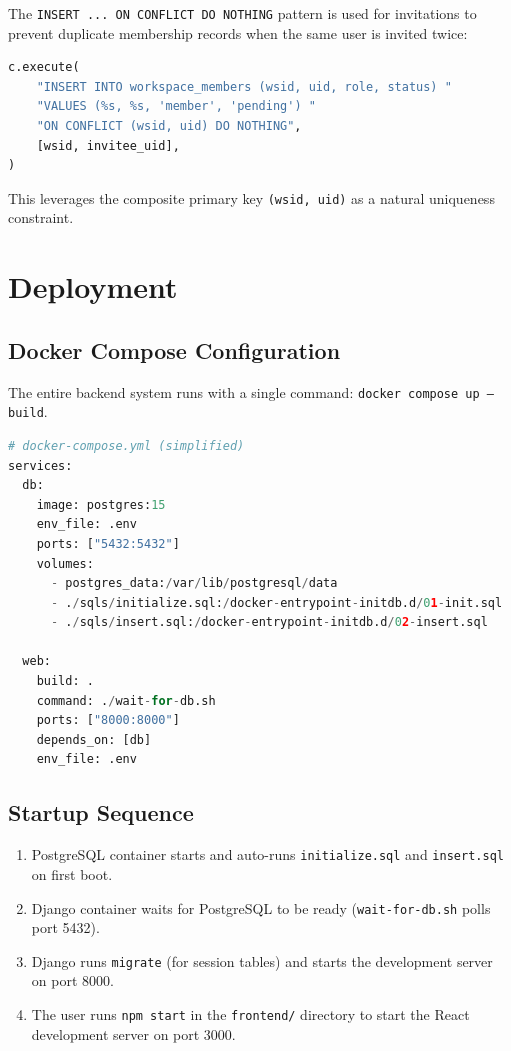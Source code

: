 \documentclass[11pt]{article}
\begin{document}
The \texttt{INSERT ... ON CONFLICT DO NOTHING} pattern is used for invitations to prevent duplicate membership records when the same user is invited twice:

\begin{lstlisting}[language=Python]
c.execute(
    "INSERT INTO workspace_members (wsid, uid, role, status) "
    "VALUES (%s, %s, 'member', 'pending') "
    "ON CONFLICT (wsid, uid) DO NOTHING",
    [wsid, invitee_uid],
)
\end{lstlisting}

This leverages the composite primary key \texttt{(wsid, uid)} as a natural uniqueness constraint.


\newpage
\section{Deployment}
\label{sec:deploy}

\subsection{Docker Compose Configuration}

The entire backend system runs with a single command: \texttt{docker compose up --build}.

\begin{lstlisting}[language=Python]
# docker-compose.yml (simplified)
services:
  db:
    image: postgres:15
    env_file: .env
    ports: ["5432:5432"]
    volumes:
      - postgres_data:/var/lib/postgresql/data
      - ./sqls/initialize.sql:/docker-entrypoint-initdb.d/01-init.sql
      - ./sqls/insert.sql:/docker-entrypoint-initdb.d/02-insert.sql

  web:
    build: .
    command: ./wait-for-db.sh
    ports: ["8000:8000"]
    depends_on: [db]
    env_file: .env
\end{lstlisting}

\subsection{Startup Sequence}

\begin{enumerate}
    \item PostgreSQL container starts and auto-runs \texttt{initialize.sql} and \texttt{insert.sql} on first boot.
    \item Django container waits for PostgreSQL to be ready (\texttt{wait-for-db.sh} polls port 5432).
    \item Django runs \texttt{migrate} (for session tables) and starts the development server on port 8000.
    \item The user runs \texttt{npm start} in the \texttt{frontend/} directory to start the React development server on port 3000.
\end{enumerate}
\end{document}
